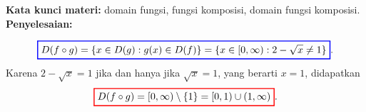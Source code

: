 \documentclass[10pt,openany,a4paper]{article}
\theoremstyle{definition}
\theoremstyle{definition}
\theoremstyle{plain}
\newenvironment{jawab}[2][tes]{
\textbf{Kata kunci materi:} #1.\\
\textbf{Penyelesaian:} #2
}{}
\begin{document}
\begin{enumerate}
\begin{jawab}[domain fungsi, fungsi komposisi, domain fungsi komposisi]
{\begin{enumerate}
            \begin{align*}
                \colorlet{oldcolor}{.}
        \color{blue}
        \setlength{\fboxrule}{1pt} \boxed{\color{oldcolor}D(f\circ g) = \{x \in D(g) : g(x) \in D(f)\} = \{x \in [0, \infty) : 2 - \sqrt{x} \neq 1\}}\color{oldcolor}.
            \end{align*}
            Karena $2 - \sqrt{x} = 1$ jika dan hanya jika $\sqrt{x} = 1$, yang berarti $x = 1$, didapatkan
            \begin{align*}
                \colorlet{oldcolor}{.}
        \color{red}
        \setlength{\fboxrule}{1pt} \boxed{\color{oldcolor}D(f\circ g) = [0, \infty) \setminus \{1\} = [0, 1) \cup (1, \infty)}\color{oldcolor}.
            \end{align*}
        \end{enumerate}
    }
        
    \end{jawab}


\end{enumerate}
\end{document}
